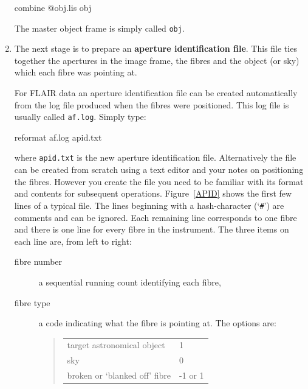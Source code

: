 \documentclass[chapters,twoside,11pt]{starlink}
\begin{document}
\begin{enumerate}
\begin{terminalv}
combine  @obj.lis  obj
\end{terminalv}

   The master object frame is simply called \texttt{obj}.

  \item The next stage is to prepare an \textbf{aperture
   identification file}.  This file ties together the apertures
   in the image frame, the fibres and the object (or sky)
   which each fibre was pointing at.

   For FLAIR data an aperture identification file can be
   created automatically from the log file produced when the
   fibres were positioned.  This log file is usually called \texttt{af.log}.  Simply type:

\begin{terminalv}
reformat  af.log  apid.txt
\end{terminalv}

   where \texttt{apid.txt} is the new aperture identification file.
   Alternatively the file can be created from scratch using a text editor
   and your notes on positioning the fibres.  However you create the file
   you need to be familiar with its format and contents for subsequent
   operations.  Figure~\ref{APID} shows the first few lines of a typical
   file.  The lines beginning with a hash-character (`\texttt{\#}') are comments
   and can be ignored.  Each remaining line corresponds to one fibre and
   there is one line for every fibre in the instrument.  The three items on
   each line are, from left to right:

  \begin{description}

    \item[fibre number] a sequential running count identifying
     each fibre,

    \item[fibre type] a code indicating what the fibre is
     pointing at.  The options are:

    \begin{verse}
    \begin{tabular}{ll}
     target astronomical object    & 1 \\
     sky                           & 0 \\
     broken or `blanked off' fibre & -1 or 1 \\
    \end{tabular}
    \end{verse}


\end{description}
\end{enumerate}
\end{document}
